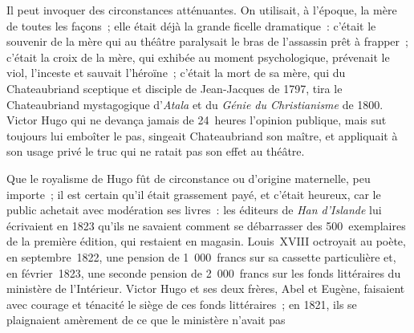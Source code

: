 \documentclass[french,twoside]{book} %
\begin{document}
\label{p11}Il peut invoquer des circonstances atténuantes. On utilisait, à l’époque, la mère de toutes les façons ; elle était déjà la grande ficelle dramatique : c’était le souvenir de la mère qui au théâtre paralysait le bras de l’assassin prêt à frapper ; c’était la croix de la mère, qui exhibée au moment psychologique, prévenait le viol, l’inceste et sauvait l’héroïne ; c’était la mort de sa mère, qui du Chateaubriand sceptique et disciple de Jean-Jacques de 1797, tira le Chateaubriand mystagogique d’\emph{Atala} et du \emph{Génie du Christianisme} de 1800. Victor Hugo qui ne devança jamais de 24 heures l’opinion publique, mais sut toujours lui emboîter le pas, singeait Chateaubriand son maître, et appliquait à son usage privé le truc qui ne ratait pas son effet au théâtre.\par
Que le royalisme de Hugo fût de circonstance ou d’origine maternelle, peu importe ; il est certain qu’il était grassement payé, et c’était heureux, car le public achetait avec modération ses livres : les éditeurs de \emph{Han d’Islande} lui écrivaient en 1823 qu’ils ne savaient comment se débarrasser des 500 exemplaires de la première édition, qui restaient en magasin. Louis XVIII octroyait au poète, en septembre 1822, une pension de 1 000 francs sur sa cassette particulière et, en février 1823, une seconde pension de 2 000 francs sur les fonds littéraires du ministère de l’Intérieur. Victor Hugo et ses deux frères, Abel et Eugène, faisaient avec courage et ténacité le siège de ces fonds littéraires ; en 1821, ils se plaignaient amèrement de ce que le ministère n’avait pas  
\end{document}
